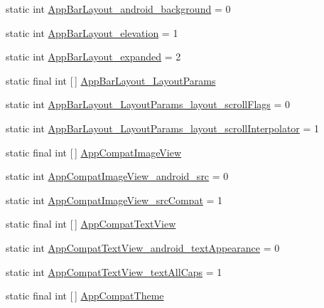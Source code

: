 \begin{DoxyCompactItemize}
\item 
static int \hyperlink{classandroid_1_1support_1_1v4_1_1R_1_1styleable_a466e2c25659363526699f5b8c84819f2}{App\+Bar\+Layout\+\_\+android\+\_\+background} = 0
\item 
static int \hyperlink{classandroid_1_1support_1_1v4_1_1R_1_1styleable_a40cbdffd2cc9c9fdad7adeb8bc114b8d}{App\+Bar\+Layout\+\_\+elevation} = 1
\item 
static int \hyperlink{classandroid_1_1support_1_1v4_1_1R_1_1styleable_a2cbf1a78895b2153260cecf4522cd109}{App\+Bar\+Layout\+\_\+expanded} = 2
\item 
static final int \mbox{[}$\,$\mbox{]} \hyperlink{classandroid_1_1support_1_1v4_1_1R_1_1styleable_a08b2a4151f7d2667720f413dc2243694}{App\+Bar\+Layout\+\_\+\+Layout\+Params}
\item 
static int \hyperlink{classandroid_1_1support_1_1v4_1_1R_1_1styleable_a23c156548a9ddc6f6a61cd5d84570527}{App\+Bar\+Layout\+\_\+\+Layout\+Params\+\_\+layout\+\_\+scroll\+Flags} = 0
\item 
static int \hyperlink{classandroid_1_1support_1_1v4_1_1R_1_1styleable_a97ee4a175966cfa75d14a9d739d0b0fd}{App\+Bar\+Layout\+\_\+\+Layout\+Params\+\_\+layout\+\_\+scroll\+Interpolator} = 1
\item 
static final int \mbox{[}$\,$\mbox{]} \hyperlink{classandroid_1_1support_1_1v4_1_1R_1_1styleable_a4d9bb42e7947f32882ba5a45bc43a0a1}{App\+Compat\+Image\+View}
\item 
static int \hyperlink{classandroid_1_1support_1_1v4_1_1R_1_1styleable_a2eb2724fb5893dd2a8a334066b964f2d}{App\+Compat\+Image\+View\+\_\+android\+\_\+src} = 0
\item 
static int \hyperlink{classandroid_1_1support_1_1v4_1_1R_1_1styleable_ae18967a7ec03c0b47f1a1f8a1eb6c4fa}{App\+Compat\+Image\+View\+\_\+src\+Compat} = 1
\item 
static final int \mbox{[}$\,$\mbox{]} \hyperlink{classandroid_1_1support_1_1v4_1_1R_1_1styleable_a88f80fd07175f06b735411ca091754c2}{App\+Compat\+Text\+View}
\item 
static int \hyperlink{classandroid_1_1support_1_1v4_1_1R_1_1styleable_ad4e24f35a933d296cd14f60c381e75b8}{App\+Compat\+Text\+View\+\_\+android\+\_\+text\+Appearance} = 0
\item 
static int \hyperlink{classandroid_1_1support_1_1v4_1_1R_1_1styleable_ad554631420683f73672ace7476a916d7}{App\+Compat\+Text\+View\+\_\+text\+All\+Caps} = 1
\item 
static final int \mbox{[}$\,$\mbox{]} \hyperlink{classandroid_1_1support_1_1v4_1_1R_1_1styleable_ac07ebbe62ed977f6dcaadc6397840ace}{App\+Compat\+Theme}

\end{DoxyCompactItemize}
